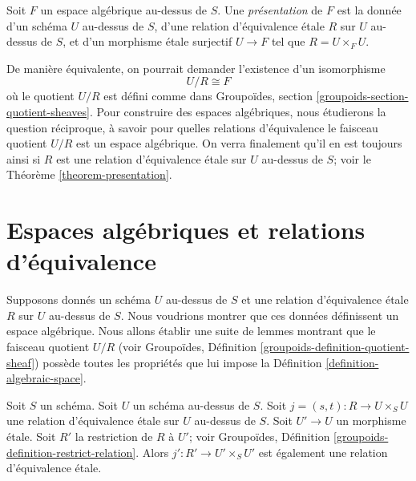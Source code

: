 \begin{definition}
\label{definition-presentation}
Soit $F$ un espace algébrique au-dessus de $S$.
Une {\it présentation} de $F$ est la donnée d'un schéma
$U$ au-dessus de $S$, d'une relation d'équivalence \'etale $R$ sur $U$ au-dessus de $S$, et
d'un morphisme \'etale surjectif $U \to F$ tel que $R = U \times_F U$.
\end{definition}

\noindent
De manière équivalente, on pourrait demander l'existence d'un isomorphisme
$$
U/R \cong F
$$
où le quotient $U/R$ est défini comme dans
Groupoïdes, section \ref{groupoids-section-quotient-sheaves}.
Pour construire des espaces algébriques, nous étudierons la question réciproque, à savoir
pour quelles relations d'équivalence le faisceau quotient $U/R$ est un espace algébrique.
On verra finalement qu'il en est toujours ainsi si $R$ est une relation
d'équivalence \'etale sur $U$ au-dessus de $S$; voir le Théorème \ref{theorem-presentation}.





























\section{Espaces algébriques et relations d'équivalence}
\label{section-spaces-from-equivalence-relations}

\noindent
Supposons donnés un schéma $U$ au-dessus de $S$
et une relation d'équivalence \'etale $R$ sur $U$ au-dessus de $S$.
Nous voudrions montrer que ces données définissent un espace algébrique.
Nous allons établir une suite de lemmes montrant que le faisceau quotient $U/R$
(voir Groupoïdes, Définition \ref{groupoids-definition-quotient-sheaf})
possède toutes les propriétés que lui impose la
Définition \ref{definition-algebraic-space}.

\begin{lemma}
\label{lemma-pullback-etale-equivalence-relation}
Soit $S$ un schéma. Soit $U$ un schéma au-dessus de $S$.
Soit $j = (s, t) : R \to U \times_S U$
une relation d'équivalence \'etale sur $U$ au-dessus de $S$.
Soit $U' \to U$ un morphisme \'etale.
Soit $R'$ la restriction de $R$ à $U'$; voir
Groupoïdes, Définition \ref{groupoids-definition-restrict-relation}.
Alors $j' : R' \to U' \times_S U'$ est également une relation
d'équivalence \'etale.
\end{lemma}

